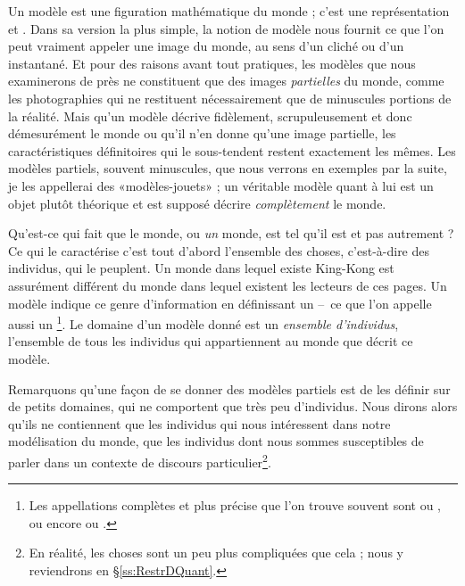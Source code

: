 Un modèle est une figuration mathématique du monde ; c'est une
représentation  et .  Dans sa version
la plus simple, la notion de modèle nous fournit ce que l'on peut
vraiment appeler une image du monde, au sens d'un cliché ou d'un
instantané.  Et pour des raisons avant tout pratiques, les modèles que
nous examinerons de près ne constituent que des images \emph{partielles}
du monde, comme les photographies qui ne restituent nécessairement que
de minuscules portions de la réalité.  Mais qu'un modèle décrive
fidèlement, scrupuleusement et donc démesurément le monde ou qu'il n'en
donne qu'une image partielle, les caractéristiques définitoires qui le
sous-tendent restent exactement les mêmes.  Les modèles partiels,
souvent minuscules, que nous verrons en exemples par la suite, je les
appellerai des {«modèles-jouets»} ; un véritable modèle quant à lui est un
objet plutôt théorique et est supposé décrire \emph{complètement} le
monde. 

Qu'est-ce qui fait que le monde, ou \emph{un} monde, est tel qu'il est
et pas autrement ?  Ce qui le caractérise c'est tout d'abord
l'ensemble des choses, c'est-à-dire des individus, qui le peuplent.
Un monde dans lequel existe King-Kong est assurément différent du
monde dans lequel existent les lecteurs de ces pages.  Un modèle
indique ce genre d'information en définissant un  --~ce
que l'on appelle aussi un %
\footnote{Les appellations
complètes et plus précise que l'on trouve souvent sont
ou , ou encore  ou 
.}.%
Le domaine d'un modèle donné  est un \emph{ensemble d'individus}, l'ensemble
de tous les individus qui 
appartiennent au
monde que décrit ce modèle.

Remarquons qu'une façon de se donner des modèles partiels est de les
définir sur de petits domaines, qui ne comportent que très peu
d'individus.  Nous dirons alors qu'ils ne contiennent que les individus
qui nous intéressent dans notre modélisation du monde, que les
individus dont nous sommes susceptibles de parler dans un contexte de
discours particulier\footnote{En réalité, les choses sont un peu plus compliquées que cela ; nous y reviendrons en \S\ref{ss:RestrDQuant}.}.

\newpage

